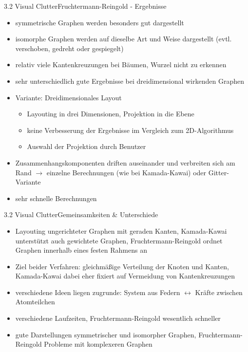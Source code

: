 \documentclass[%
11pt,a4paper,xcolor={usenames,dvipsnames}]{beamer}
\begin{document}
    \begin{frame}{3.2 Visual Clutter}{Fruchtermann-Reingold - Ergebnisse}
        \begin{itemize}
	        \item symmetrische Graphen werden besonders gut dargestellt
	        \item isomorphe Graphen werden auf dieselbe Art und Weise dargestellt (evtl. verschoben, gedreht oder gespiegelt)
	        \item relativ viele Kantenkreuzungen bei Bäumen, Wurzel nicht zu erkennen
	        \item sehr unterschiedlich gute Ergebnisse bei dreidimensional wirkenden Graphen
	        \item Variante: Dreidimensionales Layout
	    		\begin{itemize}
	    		    \item Layouting in drei Dimensionen, Projektion in die Ebene
	    		    \item keine Verbesserung der Ergebnisse im Vergleich zum 2D-Algorithmus
	    		    \item Auswahl der Projektion durch Benutzer
	    		\end{itemize}
	    	\item Zusammenhangskomponenten driften auseinander und verbreiten sich am Rand $\rightarrow$ einzelne Berechnungen (wie bei Kamada-Kawai) oder Gitter-Variante
	    	\item sehr schnelle Berechnungen
	    \end{itemize}
    \end{frame}

    \begin{frame}{3.2 Visual Clutter}{Gemeinsamkeiten \& Unterschiede}
        \begin{itemize}
    		\item Layouting ungerichteter Graphen mit geraden Kanten, Kamada-Kawai unterstützt auch gewichtete Graphen, Fruchtermann-Reingold ordnet Graphen innerhalb eines festen Rahmens an
    		\item Ziel beider Verfahren: gleichmäßige Verteilung der Knoten und Kanten, Kamada-Kawai dabei eher fixiert auf Vermeidung von Kantenkreuzungen
    		\item verschiedene Ideen liegen zugrunde: System aus Federn $\leftrightarrow$ Kräfte zwischen Atomteilchen
    		\item verschiedene Laufzeiten, Fruchtermann-Reingold wesentlich schneller
    		\item gute Darstellungen symmetrischer und isomorpher Graphen, Fruchtermann-Reingold Probleme mit komplexeren Graphen
		\end{itemize}
	\end{frame}
\end{document}
